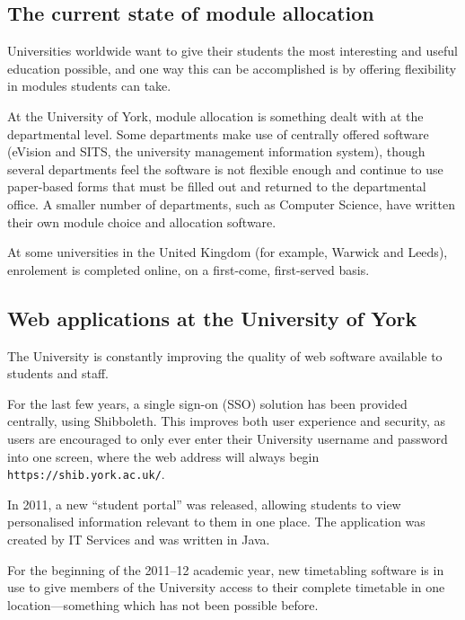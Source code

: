\documentclass[]{scrartcl}
\begin{document}
\subsection{The current state of module allocation}


Universities worldwide want to give their students the most interesting and
useful education possible, and one way this can be accomplished is by offering
flexibility in modules students can take.

At the University of York, module allocation is something dealt with at the
departmental level. Some departments make use of centrally offered software
(eVision and SITS, the university management information system), though
several departments feel the software is not flexible enough and continue to
use paper-based forms that must be filled out and returned to the departmental
office. A smaller number of departments, such as Computer Science, have
written their own module choice and allocation software.

At some universities in the United Kingdom (for example, Warwick and Leeds),
enrolement is completed online, on a first-come, first-served basis.


\subsection{Web applications at the University of York}


The University is constantly improving the quality of web software available
to students and staff.

For the last few years, a single sign-on (SSO) solution has been provided
centrally, using Shibboleth. This improves both user experience and security,
as users are encouraged to only ever enter their University username and
password into one screen, where the web address will always begin
\texttt{https://shib.york.ac.uk/}.

In 2011, a new ``student portal'' was released, allowing students to view
personalised information relevant to them in one place. The application was
created by IT Services and was written in Java.

For the beginning of the 2011--12 academic year, new timetabling software is in
use to give members of the University access to their complete timetable in
one location---something which has not been possible before.
\end{document}
